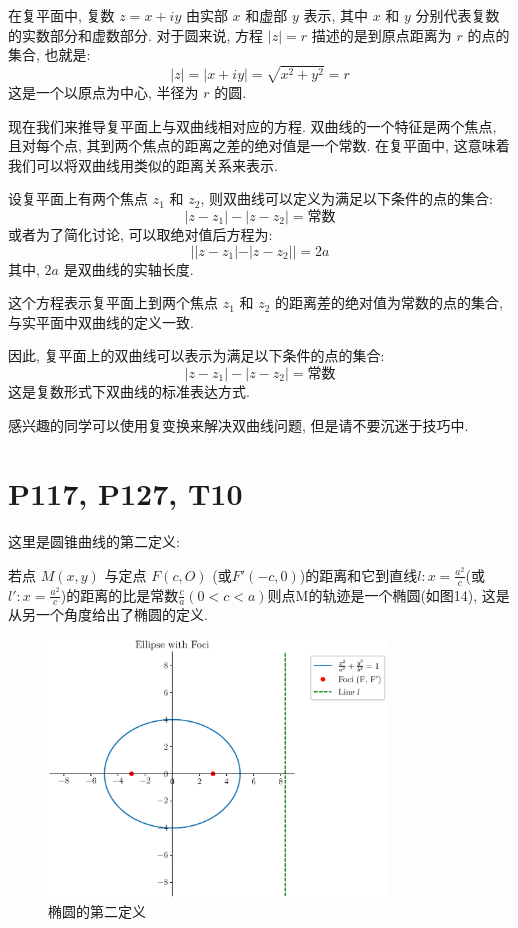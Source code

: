 \documentclass{book}
\begin{document}
        在复平面中, 复数 \( z = x + iy \) 由实部 \( x \) 和虚部 \( y \) 表示, 其中 \( x \) 和 \( y \) 分别代表复数的实数部分和虚数部分. 对于圆来说, 方程 \( |z| = r \) 描述的是到原点距离为 \( r \) 的点的集合, 也就是: 
        \[
        |z| = |x + iy| = \sqrt{x^2 + y^2} = r
        \]
        这是一个以原点为中心, 半径为 \( r \) 的圆. 

    现在我们来推导复平面上与双曲线相对应的方程. 双曲线的一个特征是两个焦点, 且对每个点, 其到两个焦点的距离之差的绝对值是一个常数. 在复平面中, 这意味着我们可以将双曲线用类似的距离关系来表示. 

    设复平面上有两个焦点 \( z_1 \) 和 \( z_2 \), 则双曲线可以定义为满足以下条件的点的集合: 
    \[
    |z - z_1| - |z - z_2| = \text{常数}
    \]
    或者为了简化讨论, 可以取绝对值后方程为: 
    \[
    ||z - z_1| - |z - z_2|| = 2a
    \]
    其中, \( 2a \) 是双曲线的实轴长度. 

    这个方程表示复平面上到两个焦点 \( z_1 \) 和 \( z_2 \) 的距离差的绝对值为常数的点的集合, 与实平面中双曲线的定义一致. 

    因此, 复平面上的双曲线可以表示为满足以下条件的点的集合: 
    \[
    |z - z_1| - |z - z_2| = \text{常数}
    \]
    这是复数形式下双曲线的标准表达方式. \cite{complex}

    感兴趣的同学可以使用复变换来解决双曲线问题, 但是请不要沉迷于技巧中.

    \section{\textcolor[rgb]{0.11,0.65,0.52}{P117, P127, T10}}

    这里是\textcolor[rgb]{0.38,0.11,0.2}{圆锥曲线的第二定义}:

    若点 $M(x,y)$ 与定点 $F(c,O)$ (或$F'(-c,0)$)的距离和它到直线$\displaystyle l:x=\frac{a^2}{c}$(或$\displaystyle l':x=\frac{a^2}{c}$)的距离的比是常数$\displaystyle \frac{c}{a}(0<c<a)$则点M的轨迹是一个椭圆(如图14), 这是从另一个角度给出了椭圆的定义.

    \begin{figure}[htbp]
        \centering
        \includegraphics[width=0.8\textwidth]{img/ConicSection2Define.eps}
        \caption{椭圆的第二定义}
    \end{figure}
\end{document}
